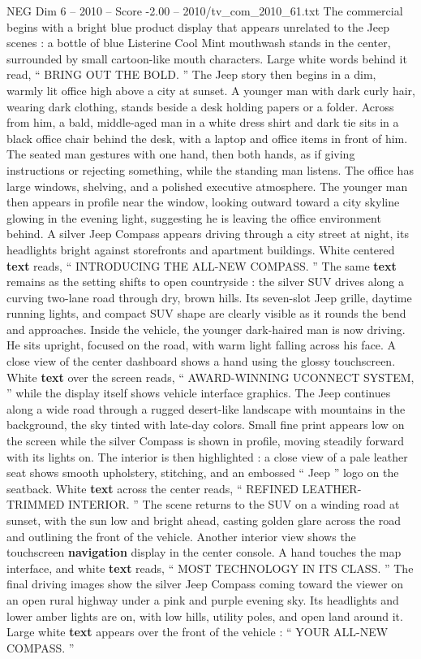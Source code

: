 \begin{textsample}{NEG Dim 6 – 2010 – Score -2.00 – 2010/tv\_com\_2010\_61.txt}  \label{ex:f6_neg_009}
The commercial begins with a bright blue product display that appears unrelated to the Jeep scenes : a bottle of blue Listerine Cool Mint mouthwash stands in the center, surrounded by small cartoon-like mouth characters.
Large white words behind it read, “ BRING OUT THE BOLD. ” The Jeep story then begins in a dim, warmly lit office high above a city at sunset.
A younger man with dark curly hair, wearing dark clothing, stands beside a desk holding papers or a folder.
Across from him, a bald, middle-aged man in a white dress shirt and dark tie sits in a black office chair behind the desk, with a laptop and office items in front of him.
The seated man gestures with one hand, then both hands, as if giving instructions or rejecting something, while the standing man listens.
The office has large windows, shelving, and a polished executive atmosphere.
The younger man then appears in profile near the window, looking outward toward a city skyline glowing in the evening light, suggesting he is leaving the office environment behind.
A silver Jeep Compass appears driving through a city street at night, its headlights bright against storefronts and apartment buildings.
White centered \textbf{text} reads, “ INTRODUCING THE ALL-NEW COMPASS. ” The same \textbf{text} remains as the setting shifts to open countryside : the silver SUV drives along a curving two-lane road through dry, brown hills.
Its seven-slot Jeep grille, daytime running lights, and compact SUV shape are clearly visible as it rounds the bend and approaches.
Inside the vehicle, the younger dark-haired man is now driving.
He sits upright, focused on the road, with warm light falling across his face.
A close view of the center dashboard shows a hand using the glossy touchscreen.
White \textbf{text} over the screen reads, “ AWARD-WINNING UCONNECT SYSTEM, ” while the display itself shows vehicle interface graphics.
The Jeep continues along a wide road through a rugged desert-like landscape with mountains in the background, the sky tinted with late-day colors.
Small fine print appears low on the screen while the silver Compass is shown in profile, moving steadily forward with its lights on.
The interior is then highlighted : a close view of a pale leather seat shows smooth upholstery, stitching, and an embossed “ Jeep ” logo on the seatback.
White \textbf{text} across the center reads, “ REFINED LEATHER-TRIMMED INTERIOR. ” The scene returns to the SUV on a winding road at sunset, with the sun low and bright ahead, casting golden glare across the road and outlining the front of the vehicle.
Another interior view shows the touchscreen \textbf{navigation} display in the center console.
A hand touches the map interface, and white \textbf{text} reads, “ MOST TECHNOLOGY IN ITS CLASS. ” The final driving images show the silver Jeep Compass coming toward the viewer on an open rural highway under a pink and purple evening sky.
Its headlights and lower amber lights are on, with low hills, utility poles, and open land around it.
Large white \textbf{text} appears over the front of the vehicle : “ YOUR ALL-NEW COMPASS. ”

\end{textsample}
